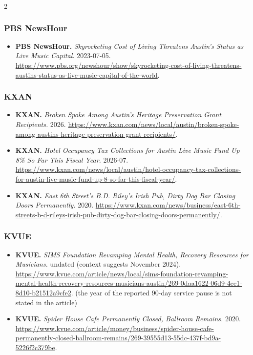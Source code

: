 {\begin{multicols}{2}
\subsubsection*{PBS NewsHour}
\begin{itemize}[itemsep=0pt,topsep=1pt,parsep=0pt,partopsep=0pt,leftmargin=1em]
\item \textbf{PBS NewsHour.} \textit{Skyrocketing Cost of Living Threatens Austin’s Status as Live Music Capital.} 2023-07-05. \url{https://www.pbs.org/newshour/show/skyrocketing-cost-of-living-threatens-austins-status-as-live-music-capital-of-the-world}.
\end{itemize}
\subsubsection*{KXAN}
\begin{itemize}[itemsep=0pt,topsep=1pt,parsep=0pt,partopsep=0pt,leftmargin=1em]
\item \textbf{KXAN.} \textit{Broken Spoke Among Austin’s Heritage Preservation Grant Recipients.} 2026. \url{https://www.kxan.com/news/local/austin/broken-spoke-among-austins-heritage-preservation-grant-recipients/}.\item \textbf{KXAN.} \textit{Hotel Occupancy Tax Collections for Austin Live Music Fund Up 8\% So Far This Fiscal Year.} 2026-07. \url{https://www.kxan.com/news/local/austin/hotel-occupancy-tax-collections-for-austin-live-music-fund-up-8-so-far-this-fiscal-year/}.\item \textbf{KXAN.} \textit{East 6th Street’s B.D. Riley’s Irish Pub, Dirty Dog Bar Closing Doors Permanently.} 2020. \url{https://www.kxan.com/news/business/east-6th-streets-b-d-rileys-irish-pub-dirty-dog-bar-closing-doors-permanently/}.\end{itemize}
\subsubsection*{KVUE}
\begin{itemize}[itemsep=0pt,topsep=1pt,parsep=0pt,partopsep=0pt,leftmargin=1em]
\item \textbf{KVUE.} \textit{SIMS Foundation Revamping Mental Health, Recovery Resources for Musicians.} undated (context suggests November 2024). \url{https://www.kvue.com/article/news/local/sims-foundation-revamping-mental-health-recovery-resources-musicians-austin/269-0daa1622-06d9-4ee1-8d10-b21512a9cfe2}. {\color{ammuted}(the year of the reported 90-day service pause is not stated in the article)}
\item \textbf{KVUE.} \textit{Spider House Cafe Permanently Closed, Ballroom Remains.} 2020. \url{https://www.kvue.com/article/money/business/spider-house-cafe-permanently-closed-ballroom-remains/269-39555d13-55dc-437f-bd9a-5226f2c379be}.\end{itemize}

\end{multicols}}
